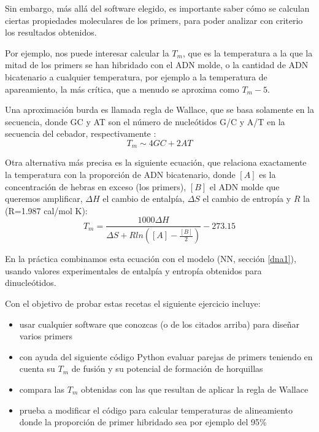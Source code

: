 Sin embargo, m\'{a}s all\'{a} del software elegido, es importante saber c\'{o}mo se calculan ciertas propiedades moleculares de los primers,
para poder analizar con criterio los resultados obtenidos. 

Por ejemplo, nos puede interesar calcular la $T_{m}$, 
que es la temperatura a la que la mitad de los primers se han hibridado con el ADN molde, 
o la cantidad de ADN bicatenario a cualquier temperatura, por ejemplo a la temperatura de apareamiento, 
la m\'{a}s cr\'{i}tica, que a menudo se aproxima como $T_{m} - 5$.

Una aproximaci\'{o}n burda es llamada regla de Wallace, que se basa solamente en la secuencia,
donde GC y AT son el n\'{u}mero de nucle\'{o}tidos G/C y A/T en la secuencia del cebador, respectivamente \citep{Santalucia2007}:
\begin{equation}
T_{m} \sim 4GC + 2AT
\end{equation}

Otra alternativa m\'{a}s precisa es la siguiente ecuaci\'{o}n, 
que relaciona exactamente la temperatura con la proporci\'{o}n de ADN bicatenario,
donde $[A]$ es la concentraci\'{o}n de hebras en exceso (los primers), $[B]$ el ADN molde que queremos amplificar,
$\Delta H$ el cambio de entalp\'{i}a, $\Delta S$ el cambio de entrop\'{i}a y $R$ la 
 (R=1.987 cal/mol K):
\begin{equation}
T_{m} = \frac{1000 \Delta H}{\Delta S + Rln([A]-\frac{[B]}{2})} - 273.15
\end{equation}


En la pr\'{a}ctica combinamos esta ecuaci\'{o}n con el modelo  (NN, secci\'{o}n \ref{dna1}), 
usando valores experimentales de entalp\'{i}a y entrop\'{i}a obtenidos para dinucle\'{o}tidos.

Con el objetivo de probar estas recetas el siguiente ejercicio incluye:
\begin{itemize}
\item usar cualquier software que conozcas (o de los citados arriba) para dise\~nar varios primers
\item con ayuda del siguiente c\'{o}digo Python evaluar parejas de primers teniendo en cuenta su $T_{m}$ 
de fusi\'{o}n y su potencial de formaci\'{o}n de horquillas
\item compara las $T_{m}$ obtenidas con las que resultan de aplicar la regla de Wallace
\item prueba a modificar el c\'{o}digo para calcular temperaturas de alineamiento donde la proporci\'{o}n
de primer hibridado sea por ejemplo del 95\%

\end{itemize}
